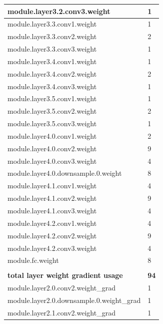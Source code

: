 \documentclass[12pt,letterpaper]{article}
\begin{document}
\begin{appendices}
\begin{longtable}{@{}ll@{}}
module.layer3.2.conv3.weight              & 1    \\ \midrule
module.layer3.3.conv1.weight              & 1    \\ \midrule
module.layer3.3.conv2.weight              & 2    \\ \midrule
module.layer3.3.conv3.weight              & 1    \\ \midrule
module.layer3.4.conv1.weight              & 1    \\ \midrule
module.layer3.4.conv2.weight              & 2    \\ \midrule
module.layer3.4.conv3.weight              & 1    \\ \midrule
module.layer3.5.conv1.weight              & 1    \\ \midrule
module.layer3.5.conv2.weight              & 2    \\ \midrule
module.layer3.5.conv3.weight              & 1    \\ \midrule
module.layer4.0.conv1.weight              & 2    \\ \midrule
module.layer4.0.conv2.weight              & 9    \\ \midrule
module.layer4.0.conv3.weight              & 4    \\ \midrule
module.layer4.0.downsample.0.weight       & 8    \\ \midrule
module.layer4.1.conv1.weight              & 4    \\ \midrule
module.layer4.1.conv2.weight              & 9    \\ \midrule
module.layer4.1.conv3.weight              & 4    \\ \midrule
module.layer4.2.conv1.weight              & 4    \\ \midrule
module.layer4.2.conv2.weight              & 9    \\ \midrule
module.layer4.2.conv3.weight              & 4    \\ \midrule
module.fc.weight                          & 8    \\ \midrule
                                          &      \\ \midrule
\textbf{total layer weight gradient usage}           & \textbf{94}  \\ \midrule
module.layer2.0.conv2.weight\_grad        & 1    \\ \midrule
module.layer2.0.downsample.0.weight\_grad & 1    \\ \midrule
module.layer2.1.conv2.weight\_grad        & 1    \\ \midrule

\end{longtable}
\end{appendices}
\end{document}
